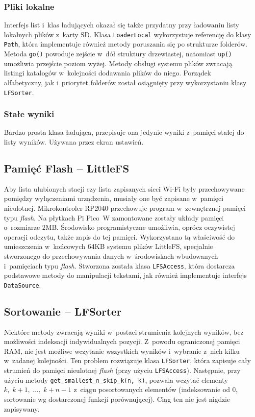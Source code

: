\documentclass[polish]{aghengthesis}
\begin{document}
			\subsubsection{Pliki lokalne}
				Interfejs list i~klas ładujących okazał się także przydatny przy ładowaniu listy lokalnych plików z~karty SD. Klasa \lstinline|LoaderLocal| wykorzystuje referencję do klasy \lstinline|Path|, która implementuje również metody poruszania się po strukturze folderów. Metoda \lstinline|go()| powoduje zejście w~dół struktury drzewiastej, natomiast \lstinline|up()| umożliwia przejście poziom wyżej. Metody obsługi systemu plików zwracają listingi katalogów w~kolejności dodawania plików do niego. Porządek alfabetyczny, jak i~priorytet folderów został osiągnięty przy wykorzystaniu klasy \lstinline|LFSorter|.
				
			\subsubsection{Stałe wyniki}
				Bardzo prosta klasa ładująca, przepisuje ona jedynie wyniki z~pamięci stałej do listy wyników. Używana przez ekran ustawień.
				
		\subsection{Pamięć Flash -- LittleFS}
			Aby lista ulubionych stacji czy lista zapisanych sieci Wi-Fi były przechowywane pomiędzy wyłączeniami urządzenia, musiały one być zapisane w~pamięci nieulotnej. Mikrokontroler RP2040 przechowuje program w~zewnętrznej pamięci typu \textit{flash}. Na płytkach Pi Pico~W zamontowane zostały układy pamięci o~rozmiarze 2MB. Środowisko programistyczne umożliwia, oprócz oczywistej operacji odczytu, także zapis do tej pamięci. Wykorzystano tą właściwość do umieszczenia w~końcowych 64KB systemu plików LittleFS\textsuperscript{\cite{littlefs}}, specjalnie stworzonego do przechowywania danych w~środowiskach wbudowanych i~pamięciach typu \textit{flash}. Stworzona została klasa \lstinline|LFSAccess|, która dostarcza podstawowe metody do manipulacji tekstami, jak również implementuje interfejs \lstinline|DataSource|.
			
		\subsection{Sortowanie -- LFSorter}
			Niektóre metody zwracają wyniki w~postaci strumienia kolejnych wyników, bez możliwości indeksacji indywidualnych pozycji. Z~powodu ograniczonej pamięci RAM, nie jest możliwe wczytanie wszystkich wyników i~wybranie z~nich kilku w~zadanej kolejności. Ten problem rozwiązuje klasa \lstinline|LFSorter|, która zapisuje cały strumień do pamięci nieulotnej \textit{flash} (przy użyciu \lstinline|LFSAccess|). Następnie, przy użyciu metody \lstinline|get_smallest_n_skip_k(n, k)|, pozwala wczytać elementy $k,\; k+1,\; ...,\; k+n-1$ z~ciągu posortowanych elementów (indeksowanie od 0, sortowanie wg dostarczonej funkcji porównującej). Ciąg ten nie jest nigdzie zapisywany.
			
\end{document}
